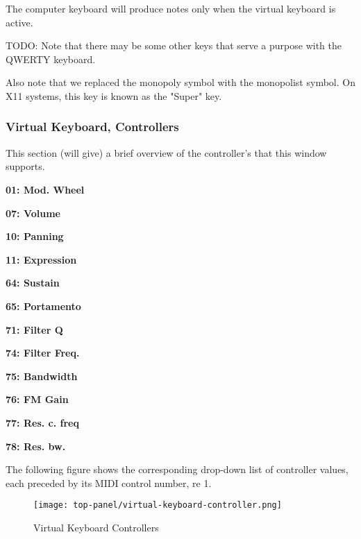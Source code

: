    The computer keyboard will produce notes only when the virtual keyboard
   is active.

   TODO: Note that there may be some other keys that serve a purpose with
   the QWERTY keyboard.

   Also note that we replaced the monopoly symbol with the monopolist
   symbol.  On X11 systems, this key is known as the "Super" key.

\subsubsection{Virtual Keyboard, Controllers}
\label{subsubsec:virtual_keyboard_controllers}

   This section (will give) a brief overview of the controller's that this
   window supports.

   \begin{enumber}
      \item \textbf{01: Mod. Wheel}
      \item \textbf{07: Volume}
      \item \textbf{10: Panning}
      \item \textbf{11: Expression}
      \item \textbf{64: Sustain}
      \item \textbf{65: Portamento}
      \item \textbf{71: Filter Q}
      \item \textbf{74: Filter Freq.}
      \item \textbf{75: Bandwidth}
      \item \textbf{76: FM Gain}
      \item \textbf{77: Res. c. freq}
      \item \textbf{78: Res. bw.}
   \end{enumber}

      The following figure shows the corresponding drop-down list of controller
      values, each preceded by its MIDI control number, re 1.

\begin{figure}[H]
   \centering 
   \texttt{[image: top-panel/virtual-keyboard-controller.png]}
   \caption{Virtual Keyboard Controllers}
   \label{fig:virtual_keyboard_controllers}
\end{figure}

   \setcounter{ItemCounter}{0}      %

